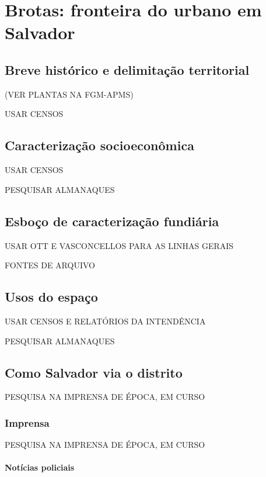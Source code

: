 \chapter{Brotas: fronteira do urbano em Salvador}\label{cap:2}

\section{Breve histórico e delimitação territorial}\label{sec:2.1}

(VER PLANTAS NA FGM-APMS)

USAR CENSOS

\section{Caracterização socioeconômica}\label{sec:2.2}

USAR CENSOS

PESQUISAR ALMANAQUES

\section{Esboço de caracterização fundiária}\label{sec:2.3}

USAR OTT E VASCONCELLOS PARA AS LINHAS GERAIS

FONTES DE ARQUIVO

\section{Usos do espaço}\label{sec:2.4}

USAR CENSOS E RELATÓRIOS DA INTENDÊNCIA

PESQUISAR ALMANAQUES

\section{Como Salvador via o distrito}\label{sec:2.5}

PESQUISA NA IMPRENSA DE ÉPOCA, EM CURSO

\subsection{Imprensa}\label{subsec:2.5.1}

PESQUISA NA IMPRENSA DE ÉPOCA, EM CURSO

\subsubsection{Notícias policiais}\label{subsubsec:2.5.1.1}

